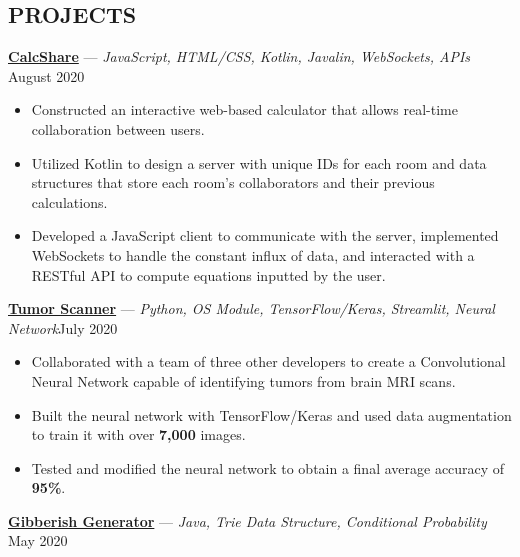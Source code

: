 \documentclass[11pt]{res}
\begin{document}
\begin{footnotesize}
\begin{resume}
\begin{small}
\section{PROJECTS}
\end{small} 
\vspace{.5mm}
\href{https://github.com/CharlesShi12/CalcShare}{\textbf{CalcShare}} — {\sl JavaScript, HTML/CSS, Kotlin, Javalin, WebSockets, APIs} \hfill August 2020\vspace{-5mm}
\begin{itemize}[leftmargin=6.25mm] \itemsep -2pt 
\item Constructed an interactive web-based calculator that allows real-time collaboration between users. 
\vspace{1mm}
\item Utilized Kotlin to design a server with unique IDs for each room and data structures that store each room's collaborators and their previous calculations.
\vspace{1mm}
\item Developed a JavaScript client to communicate with the server, implemented WebSockets to handle the constant influx of data, and interacted with a RESTful API to compute equations inputted by the user. 
\end{itemize}
\vspace{-2.5mm}
\href{https://github.com/CharlesShi12/AI_Tumor_Scanner}{\textbf{Tumor Scanner}} — {\sl Python, OS Module, TensorFlow/Keras, Streamlit, Neural Network}\hfill July 2020\vspace{-5mm}
\begin{itemize}[leftmargin=6.25mm] \itemsep -2pt 
\item Collaborated with a team of three other developers to create a Convolutional Neural Network capable of identifying tumors from brain MRI scans.
\vspace{1mm}
\item Built the neural network with TensorFlow/Keras and used data augmentation to train it with over \textbf{7,000} images.
\vspace{1mm}
\item Tested and modified the neural network to obtain a final average accuracy of \textbf{95\%}. 
\end{itemize}
\vspace{-2.5mm}
\href{https://github.com/CharlesShi12/GibberishGenerator}{\textbf{Gibberish Generator}} — {\sl Java, Trie Data Structure, Conditional Probability} \hfill May 2020\vspace{-5mm}

\end{resume}
\end{footnotesize}
\end{document}
